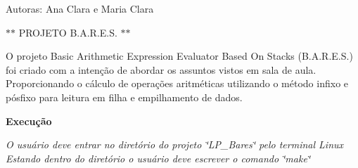 Autoras\+: Ana Clara e Maria Clara

$\ast$$\ast$ P\+R\+O\+J\+E\+T\+O B.\+A.\+R.\+E.\+S. $\ast$$\ast$

O projeto Basic Arithmetic Expression Evaluator Based On Stacks (B.\+A.\+R.\+E.\+S.) foi criado com a intenção de abordar os assuntos vistos em sala de aula. Proporcionando o cálculo de operações aritméticas utilizando o método infixo e pósfixo para leitura em filha e empilhamento de dados.

{\bfseries Execução}

{\itshape O usuário deve entrar no diretório do projeto \char`\"{}\+L\+P\+\_\+\+Bares\char`\"{} pelo terminal Linux} {\itshape Estando dentro do diretório o usuário deve escrever o comando \char`\"{}make\char`\"{}} 